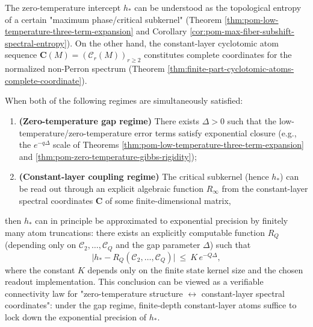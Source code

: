 \begin{remark}\label{rem:pom-zero-temperature-intercept-cyclotomic-truncation}
The zero-temperature intercept \(h_\ast\) can be understood as the topological entropy of a certain "maximum phase/critical subkernel" (Theorem \ref{thm:pom-low-temperature-three-term-expansion} and Corollary \ref{cor:pom-max-fiber-subshift-spectral-entropy}).
On the other hand, the constant-layer cyclotomic atom sequence \(\mathbf{C}(M)=(\mathcal{C}_r(M))_{r\ge2}\) constitutes complete coordinates for the normalized non-Perron spectrum (Theorem \ref{thm:finite-part-cyclotomic-atoms-complete-coordinate}).
\par
When both of the following regimes are simultaneously satisfied:
\begin{enumerate}
  \item \textbf{(Zero-temperature gap regime)} There exists \(\Delta>0\) such that the low-temperature/zero-temperature error terms satisfy exponential closure (e.g., the \(e^{-q\Delta}\) scale of Theorems \ref{thm:pom-low-temperature-three-term-expansion} and \ref{thm:pom-zero-temperature-gibbs-rigidity});
  \item \textbf{(Constant-layer coupling regime)} The critical subkernel (hence \(h_\ast\)) can be read out through an explicit algebraic function \(R_\infty\) from the constant-layer spectral coordinates \(\mathbf{C}\) of some finite-dimensional matrix,
\end{enumerate}
then \(h_\ast\) can in principle be approximated to exponential precision by finitely many atom truncations: there exists an explicitly computable function \(R_Q\) (depending only on \(\mathcal{C}_2,\dots,\mathcal{C}_Q\) and the gap parameter \(\Delta\)) such that
\[
\bigl|h_\ast-R_Q(\mathcal{C}_2,\dots,\mathcal{C}_Q)\bigr|\ \le\ K\,e^{-Q\Delta},
\]
where the constant \(K\) depends only on the finite state kernel size and the chosen readout implementation.
This conclusion can be viewed as a verifiable connectivity law for "zero-temperature structure \(\leftrightarrow\) constant-layer spectral coordinates": under the gap regime, finite-depth constant-layer atoms suffice to lock down the exponential precision of \(h_\ast\).
\end{remark}
